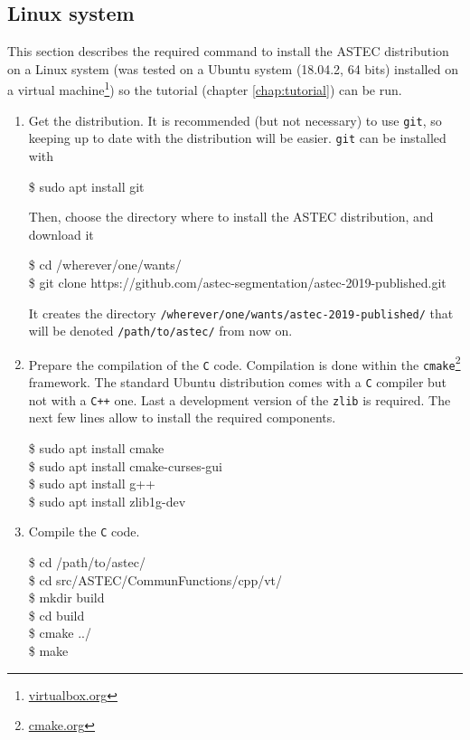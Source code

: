 \subsection{Linux system}

This section describes the required command to install the ASTEC
distribution on a Linux system (was tested on a Ubuntu system
(18.04.2, 64 bits) installed on a virtual
machine\footnote{\url{virtualbox.org}}) so the tutorial (chapter \ref{chap:tutorial}) can be run.

\begin{enumerate}
\item Get the distribution. It is recommended (but not necessary) to
  use \texttt{git}, so keeping up to date with the distribution will
  be easier.   \texttt{git} can be installed with
  \begin{code}{0.8}
  \$ sudo apt install git
  \end{code}
  Then, choose the directory where to install the ASTEC distribution,
  and download it
  \begin{code}{0.8}
    \$ cd /wherever/one/wants/ \\
    \$ git clone https://github.com/astec-segmentation/astec-2019-published.git
  \end{code}
  It creates the directory
  \texttt{/wherever/one/wants/astec-2019-published/} that will be
  denoted \texttt{/path/to/astec/} from now on.


\item Prepare the compilation of the \texttt{C} code. Compilation is done within the
  \texttt{cmake}\footnote{\url{cmake.org}} framework. The standard
  Ubuntu distribution comes with a \texttt{C} compiler but not with a
  \texttt{C++} one. Last a development version of the \texttt{zlib} is
  required. The next few lines allow to install the required components.
  \begin{code}{0.8}
    \$ sudo apt install cmake \\
    \$ sudo apt install cmake-curses-gui \\
    \$ sudo apt install g++ \\
    \$ sudo apt install zlib1g-dev
  \end{code}
\item Compile the \texttt{C} code.
    \begin{code}{0.8}
    \$ cd /path/to/astec/ \\
    \$ cd src/ASTEC/CommunFunctions/cpp/vt/ \\
    \$ mkdir build \\
    \$ cd build \\
    \$ cmake ../ \\
    \$ make \\
  \end{code}


\end{enumerate}
